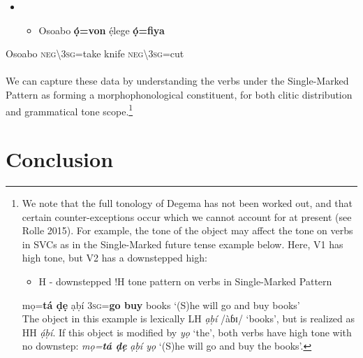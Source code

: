 \documentclass[output=paper]{langsci/langscibook}
\begin{document}
\begin{itemize}
\item \setcounter{itemize}{0}
\begin{itemize}
\item \gll *Osoabo  \textbf{ọ́=von}       ẹ́lege   \textbf{ọ́=fiya}\\
\end{itemize}
\end{itemize}
     Osoabo   \textsc{neg{\textbackslash}3sg}=take   knife   \textsc{neg{\textbackslash}}3\textsc{sg}=cut\\\\
We can capture these data by understanding the verbs under the Single-Marked Pattern as forming a morphophonological constituent, for both clitic distribution and grammatical tone scope.\footnote{We note that the full tonology of Degema has not been worked out, and that certain counter-exceptions occur which we cannot account for at present (see Rolle 2015). For example, the tone of the object may affect the tone on verbs in SVCs as in the Single-Marked future tense example below. Here, V1 has high tone, but V2 has a downstepped high:

\setcounter{itemize}{0}
\begin{itemize}
\item \begin{styleNoSpacing}
H - downstepped !H tone pattern on verbs in Single-Marked Pattern
\end{styleNoSpacing}
\end{itemize}
mọ=\textbf{tá    ḍẹ }  ạḅí
3\textsc{sg}=\textbf{go  buy }  books
‘(S)he will go and buy books’ \\

The object in this example is lexically LH \textit{ạḅí }/àɓɪ/\textit{ }‘books’, but is realized as HH \textit{ạ́ḅí}. If this object is modified by \textit{yọ} ‘the’, both verbs have high tone with no downstep: \textit{mọ=}\textbf{\textit{tá ḍẹ }}\textit{ạḅí yọ} ‘(S)he will go and buy the books’. }

\chapter{Conclusion}
\end{document}
